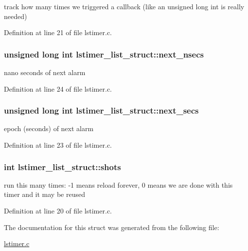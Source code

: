 track how many times we triggered a callback (like an unsigned long int is really needed) 

Definition at line 21 of file lstimer.c.\hypertarget{structlstimer__list__struct_ab115115d5be7933f98a094b46b6583bb}{
\subsubsection[{next\_\-nsecs}]{\setlength{\rightskip}{0pt plus 5cm}unsigned long int {\bf lstimer\_\-list\_\-struct::next\_\-nsecs}}}
\label{structlstimer__list__struct_ab115115d5be7933f98a094b46b6583bb}


nano seconds of next alarm 

Definition at line 24 of file lstimer.c.\hypertarget{structlstimer__list__struct_af0dcaad37472462c9f27d54ed0ceb75d}{
\subsubsection[{next\_\-secs}]{\setlength{\rightskip}{0pt plus 5cm}unsigned long int {\bf lstimer\_\-list\_\-struct::next\_\-secs}}}
\label{structlstimer__list__struct_af0dcaad37472462c9f27d54ed0ceb75d}


epoch (seconds) of next alarm 

Definition at line 23 of file lstimer.c.\hypertarget{structlstimer__list__struct_ac7ab4cd1f3065156f95b49e66bf05283}{
\subsubsection[{shots}]{\setlength{\rightskip}{0pt plus 5cm}int {\bf lstimer\_\-list\_\-struct::shots}}}
\label{structlstimer__list__struct_ac7ab4cd1f3065156f95b49e66bf05283}


run this many times: -\/1 means reload forever, 0 means we are done with this timer and it may be reused 

Definition at line 20 of file lstimer.c.

The documentation for this struct was generated from the following file:\begin{DoxyCompactItemize}
\item 
\hyperlink{lstimer_8c}{lstimer.c}\end{DoxyCompactItemize}
